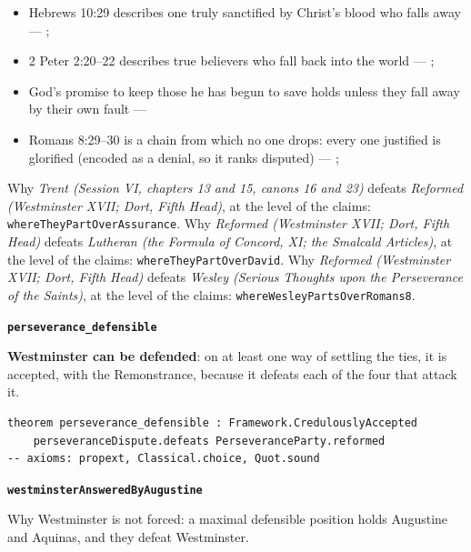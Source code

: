 \documentclass[11pt]{article}
\begin{document}
\begin{itemize}
\begin{itemize}
\item Hebrews 10:29 describes one truly sanctified by Christ’s blood who falls away --- \cite[448--449]{wesley-works-9-1827}; \cite[585]{wesley-explanatory-notes-nt}
\item 2 Peter 2:20–22 describes true believers who fall back into the world --- \cite[445--446]{wesley-works-9-1827}; \cite[625]{wesley-explanatory-notes-nt}
\item God’s promise to keep those he has begun to save holds unless they fall away by their own fault --- \cite[444--445]{wesley-works-9-1827}
\item Romans 8:29–30 is a chain from which no one drops: every one justified is glorified (encoded as a denial, so it ranks disputed) --- \cite[384]{wesley-explanatory-notes-nt}; \cite[413]{wesley-works-9-1827}
\end{itemize}
\end{itemize}
\noindent Why \emph{Trent (Session VI, chapters 13 and 15, canons 16 and 23)} defeats \emph{Reformed (Westminster XVII; Dort, Fifth Head)}, at the level of the claims: \texttt{where\allowbreak{}They\allowbreak{}Part\allowbreak{}Over\allowbreak{}Assurance}.
\noindent Why \emph{Reformed (Westminster XVII; Dort, Fifth Head)} defeats \emph{Lutheran (the Formula of Concord, XI; the Smalcald Articles)}, at the level of the claims: \texttt{where\allowbreak{}They\allowbreak{}Part\allowbreak{}Over\allowbreak{}David}.
\noindent Why \emph{Reformed (Westminster XVII; Dort, Fifth Head)} defeats \emph{Wesley (Serious Thoughts upon the Perseverance of the Saints)}, at the level of the claims: \texttt{where\allowbreak{}Wesley\allowbreak{}Parts\allowbreak{}Over\allowbreak{}Romans8}.
\par\medskip\noindent\textbf{\texttt{perseverance\_\allowbreak{}defensible}}\par\nobreak\noindent
\textbf{Westminster can be defended}: on at least one way of settling the ties, it is accepted, with the Remonstrance, because it defeats each of the four that attack it.

{\small\begin{verbatim}
theorem perseverance_defensible : Framework.CredulouslyAccepted
    perseveranceDispute.defeats PerseveranceParty.reformed
-- axioms: propext, Classical.choice, Quot.sound
\end{verbatim}}
\par\medskip\noindent\textbf{\texttt{westminster\allowbreak{}Answered\allowbreak{}By\allowbreak{}Augustine}}\par\nobreak\noindent
Why Westminster is not forced: a maximal defensible position holds Augustine and Aquinas, and they defeat Westminster.
\end{document}
